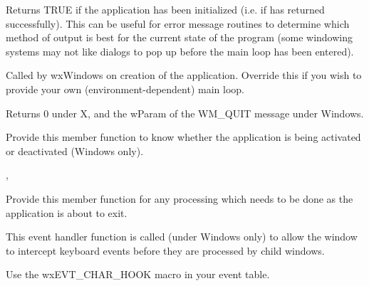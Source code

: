 \label{wxappinitialized}


Returns TRUE if the application has been initialized (i.e. if\rtfsp
{} has returned successfully).  This can be useful for error
message routines to determine which method of output is best for the
current state of the program (some windowing systems may not like
dialogs to pop up before the main loop has been entered).

\label{wxappmainloop}


Called by wxWindows on creation of the application. Override this if you wish
to provide your own (environment-dependent) main loop.


Returns 0 under X, and the wParam of the WM\_QUIT message under Windows.

\label{wxapponactivate}


Provide this member function to know whether the application is being
activated or deactivated (Windows only).


, 

\label{wxapponexit}


Provide this member function for any processing which needs to be done as
the application is about to exit.

\label{wxapponcharhook}


This event handler function is called (under Windows only) to allow the window to intercept keyboard events
before they are processed by child windows.




Use the wxEVT\_CHAR\_HOOK macro in your event table.

